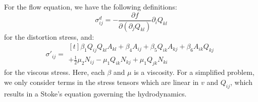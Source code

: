 \documentclass[reqno]{article}
\begin{document}
For the flow equation, we have the following definitions:
\begin{equation}
  \sigma^d_{ij}
  =
  - \frac{\partial f}{\partial (\partial_j Q_{kl})} \partial_i Q_{kl}
\end{equation}
for the distortion stress, and:
\begin{equation}
  \sigma'_{ij}
  =
  \begin{multlined}[t]
    \beta_1 Q_{ij} Q_{kl} A_{kl}
    + \beta_4 A_{ij}
    + \beta_5 Q_{ik} A_{kj}
    + \beta_6 A_{ik} Q_{kj} \\
    + \frac12 \mu_2 N_{ij}
    - \mu_1 Q_{ik} N_{kj}
    + \mu_1 Q_{jk} N_{ki}
  \end{multlined}
\end{equation}
for the viscous stress.
Here, each $\beta$ and $\mu$ is a viscosity.
For a simplified problem, we only consider terms in the stress tensors which are
linear in $v$ and $Q_{ij}$, which results in a Stoke's equation governing the
hydrodynamics.
\end{document}
